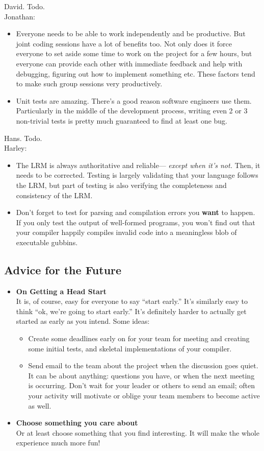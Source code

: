 David. Todo.\\

Jonathan:
\begin{itemize}
\item Everyone needs to be able to work independently and be productive. But joint coding sessions have a lot of benefits too. Not only does it force everyone to set aside some time to work on the project for a few hours, but everyone can provide each other with immediate feedback and help with debugging, figuring out how to implement something etc. These factors tend to make such group sessions very productively. 
\item Unit tests are amazing. There's a good reason software engineers use them. Particularly in the middle of the development process, writing even 2 or 3 non-trivial tests is pretty much guaranteed to find at least one bug. 
\end{itemize}

Hans. Todo.\\

Harley:
\begin{itemize}
\item The LRM is always authoritative and reliable--- {\it except when it's not.} Then, it needs to be corrected. Testing is largely validating that your language follows the LRM, but part of testing is  also verifying the completeness  and consistency of the LRM. 
\item Don't forget to test for parsing and compilation errors you {\bf want} to happen. If you only test the output of well-formed programs, you won't find out that your compiler happily compiles invalid code into a meaningless blob of executable gubbins.
\end{itemize}

\subsection{Advice for the Future}
\begin{itemize}
\item {\bf On Getting a Head Start}\\
It is, of course, easy for everyone to say ``start early.'' It's similarly easy to think ``ok, we're going to start early.''  It's definitely harder to actually get started as early as you intend. Some ideas:
\begin{itemize}
\item Create some deadlines early on for your team for meeting and creating some initial tests, and skeletal implementations of your compiler. 
\item Send email to the  team about the project when the discussion goes quiet. It can be about anything: questions you have, or when the next meeting is occurring. Don't wait for your leader or others to send an email; often your activity will motivate or oblige your team members to become active as well.
\end{itemize}
\item {\bf Choose something you care about}\\
Or at least choose something that you find interesting. It will make the whole experience much more fun!
\end{itemize}